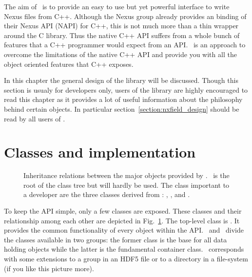 
The aim of \pninx\ is to provide an easy to use but yet powerful interface
to write Nexus files from C++. Although the Nexus group already provides 
an binding of their Nexus API (NAPI) for C++, this is not much more than a 
thin wrapper around the C library. Thus the native C++ API suffers from 
a whole bunch of features that a C++ programmer would expect from an API. 
\pninx\ is an approach to overcome the limitations of the native C++ API 
and provide you with all the object oriented features that C++ exposes.

In this chapter the general design of the library will be discussed. 
Though this section is usualy for developers only, users of the library 
are highly encouraged to read this chapter as it provides a lot of useful 
information about the philosophy behind certain objects. In particular 
section~\ref{section:nxfield_design} should be read by all users of \pninx. 

\section{Classes and implementation}\label{section:classes_implementation}

\begin{figure}[tb]
\centering
{}
\caption{{\small\label{fig:class_inheritance}
Inheritance relations between the major objects provided by \pninx.
\nxobject\ is the root of the class tree but will hardly be used. 
The class important to a developer are the three classes derived from 
\nxobject: \nxfield, \nxgroup, and \nxfile.
}}
\end{figure}
To keep the API simple, only a few classes are exposed. These classes and their 
relationship among each other are depicted in Fig.~\ref{fig:class_inheritance}. 
The top-level class is \nxobject. It provides the common functionality 
of every object within the API. \nxfield\ and \nxgroup\ divide the classes 
available in two groups: the former class is the base for all data holding
objects while the latter is the fundamental container class. 
\nxgroup\ corresponds with some extensions to a group in an HDF5 file or to 
a directory in a file-system (if you like this picture more). 

